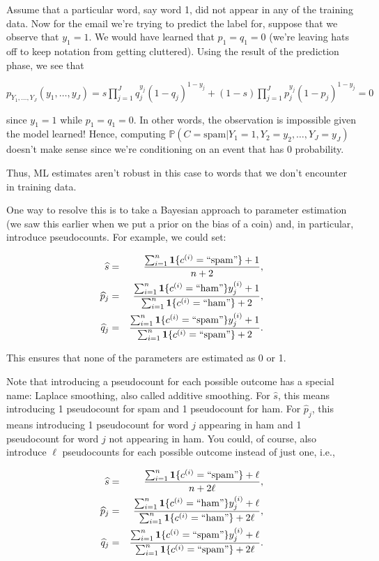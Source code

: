 Assume that a particular word, say word 1, did not appear in any of the training data. Now for the email we're trying to predict the label for, suppose that we observe that $y_1=1$. We would have learned that $p_{1}=q_{1}=0$ (we're leaving hats off to keep notation from getting cluttered). Using the result of the prediction phase, we see that

{\centering$p_{Y_{1},\dots ,Y_{J}}(y_{1},\dots ,y_{J})=s\prod _{j=1}^{J}q_{j}^{y_{j}}(1-q_{j})^{1-y_{j}}+(1-s)\prod _{j=1}^{J}p_{j}^{y_{j}}(1-p_{j})^{1-y_{j}}=0$ \par}
 
since $y_1=1$ while $p_{1}=q_{1}=0$. In other words, the observation is impossible given the model learned! Hence, computing $\mathbb {P}(C=\text {spam}|Y_{1}=1,Y_{2}=y_{2},\dots ,Y_{J}=y_{J})$ doesn't make sense since we're conditioning on an event that has 0 probability.

Thus, ML estimates aren't robust in this case to words that we don't encounter in training data.

One way to resolve this is to take a Bayesian approach to parameter estimation (we saw this earlier when we put a prior on the bias of a coin) and, in particular, introduce pseudocounts. For example, we could set:

\begin{eqnarray*}
\widehat{s} & =&\frac{\sum_{i=1}^{n}\mathbf{1}\{c^{(i)}=``\text{spam}"\}+1}{n+2},\\
\widehat{p}_{j} & =&\frac{\sum_{i=1}^{n}\mathbf{1}\{c^{(i)}=``\text{ham}"\}y_{j}^{(i)}+1}{\sum_{i=1}^{n}\mathbf{1}\{c^{(i)}=``\text{ham}"\}+2},\\
\widehat{q}_{j} & =&\frac{\sum_{i=1}^{n}\mathbf{1}\{c^{(i)}=``\text{spam}"\}y_{j}^{(i)}+1}{\sum_{i=1}^{n}\mathbf{1}\{c^{(i)}=``\text{spam}"\}+2}.
\end{eqnarray*}
 
This ensures that none of the parameters are estimated as 0 or 1.

Note that introducing a pseudocount for each possible outcome has a special name: Laplace smoothing, also called additive smoothing. For $\widehat{s}$, this means introducing 1 pseudocount for spam and 1 pseudocount for ham. For $\widehat{p}_{j}$, this means introducing 1 pseudocount for word $j$ appearing in ham and 1 pseudocount for word $j$ not appearing in ham. You could, of course, also introduce $\ell$ pseudocounts for each possible outcome instead of just one, i.e.,

\begin{eqnarray*}
\widehat{s} & =&\frac{\sum_{i=1}^{n}\mathbf{1}\{c^{(i)}=``\text{spam}"\}+\ell}{n+2\ell},\\
\widehat{p}_{j} & =&\frac{\sum_{i=1}^{n}\mathbf{1}\{c^{(i)}=``\text{ham}"\}y_{j}^{(i)}+\ell}{\sum_{i=1}^{n}\mathbf{1}\{c^{(i)}=``\text{ham}"\}+2\ell},\\
\widehat{q}_{j} & =&\frac{\sum_{i=1}^{n}\mathbf{1}\{c^{(i)}=``\text{spam}"\}y_{j}^{(i)}+\ell}{\sum_{i=1}^{n}\mathbf{1}\{c^{(i)}=``\text{spam}"\}+2\ell}.
\end{eqnarray*}


